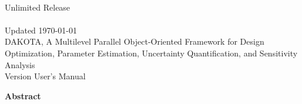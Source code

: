 \documentclass[letterpaper]{book}
\begin{document}
\begin{titlepage}
\setcounter{page}{3}
\begin{center}
{\large \DakotaSANDUsers}\\
{\large Unlimited Release}\\
{\large \DakotaSANDDate}\\
{\large Updated \today}\\

\vspace*{1.5cm}
{\LARGE DAKOTA, A Multilevel Parallel Object-Oriented Framework for 
Design Optimization, Parameter Estimation, Uncertainty Quantification, 
and Sensitivity Analysis}\\
\vspace*{1cm}
{\LARGE Version \DakotaVersion\space User's Manual}\\
\vspace*{1cm}

\DakotaAuthorFormatted
\vspace*{1cm}

\newpage

{\Large \bf Abstract}
\end{center}

\DakotaAbstractShared
\DakotaAbstractUsers

\end{titlepage}

\cleardoublepage
\tableofcontents
\cleardoublepage

\setcounter{secnumdepth}{-1} %

\setcounter{secnumdepth}{6} %

























\end{document}

